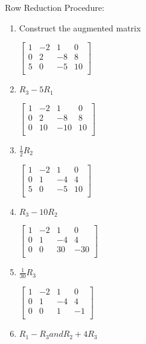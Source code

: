 \documentclass[12pt]{article} %
\begin{document}
\indent Row Reduction Procedure:
\begin{enumerate}
	\item Construct the augmented matrix
		\begin{center}
			$\begin{bmatrix}
				1 & -2 & 1 & 0\\ 
				0 & 2 & -8 & 8\\
				5 & 0 & -5 & 10\\
			 \end{bmatrix}$
		\end{center}
	\item $R_3 - 5R_1$
		\begin{center}
			$\begin{bmatrix}
				1 & -2 & 1 & 0\\ 
				0 & 2 & -8 & 8\\
				0 & 10 & -10 & 10\\
			 \end{bmatrix}$
		\end{center}
	\item $\frac{1}{2} R_2$
		\begin{center}
			$\begin{bmatrix}
				1 & -2 & 1 & 0\\ 
				0 & 1 & -4 & 4\\
				5 & 0 & -5 & 10\\
			 \end{bmatrix}$
		\end{center}
	\item $R_3 - 10R_2$
		\begin{center}
			$\begin{bmatrix}
				1 & -2 & 1 & 0\\ 
				0 & 1 & -4 & 4\\
				0 & 0 & 30 & -30\\
			 \end{bmatrix}$
		\end{center}
	\item $\frac{1}{30}R_3$
		\begin{center}
			$\begin{bmatrix}
				1 & -2 & 1 & 0\\ 
				0 & 1 & -4 & 4\\
				0 & 0 & 1 & -1\\
			 \end{bmatrix}$
		\end{center}
	\item $R_1 - R_3 and R_2 + 4R_3$
		\begin{center}

\end{center}
\end{enumerate}
\end{document}
